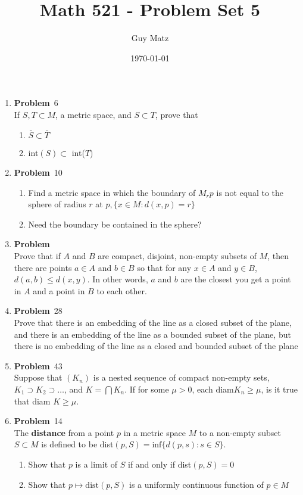 \documentclass[12pt]{amsart}
\title{\textbf{Math 521 - Problem Set 5}}
\author{Guy Matz}
\date{\today}
\newcommand{\benu}{\begin{enumerate}}
\newcommand{\eenu}{\end{enumerate}}
\theoremstyle{definition}
\newcommand{\itep}{\item {\bfseries Problem}\ }
\begin{document}
 


\begin{enumerate}[series=p]
\itep 6\\
If $S, T \subset M$, a metric space, and $S \subset T$, prove that
	\benu
	\item $\bar{S} \subset \bar{T}$
	\item int$(S) \subset$ int($T$) 
	\eenu
\newpage

\itep 10\\
\benu
	\item Find a metric space in which the boundary of $M_rp$ is not equal to the sphere of radius $r$ at $p, \{x \in M : d(x,p) = r\}$
	\item Need the boundary be contained in the sphere?
\eenu

\newpage

\itep \\
Prove that if $A$ and $B$ are compact, disjoint, non-empty subsets of $M$, then there are points $a\in A$ and $b\in B$ so that for any $x\in A$ and $y\in B$, $d(a,b)\leq d(x,y)$. In other words, $a$ and $b$ are the closest you get a point in $A$ and a point in $B$ to each other.

\newpage

\itep 28\\
Prove that there is an embedding of the line as a closed subset of the plane, and there is an embedding of the line as a bounded subset of the plane, but there is no embedding of the line as a closed and bounded subset of the plane

\newpage

\itep 43 \\
Suppose that $(K_n)$ is a nested sequence of compact non-empty sets, $K_1 \supset K_2 \supset \dots $, and $K = \bigcap K_n$.  If for some $\mu > 0$, each diam$K_n \geq \mu$, is it true that diam $K \geq \mu$.
\newpage

\itep 14\\
The \textbf{distance} from a point $p$ in a metric space $M$ to a non-empty subset $S \subset M$ is defined to be dist$(p, S) = \text{inf}\{d(p,s): s \in S\}$.
	\benu
		\item Show that $p$ is a limit of $S$ if and only if dist$(p,S) = 0$
		\item Show that $p \mapsto \text{dist}(p, S)$ is a uniformly continuous function of $p \in M$
	\eenu
\newpage


\end{enumerate}
\end{document}
